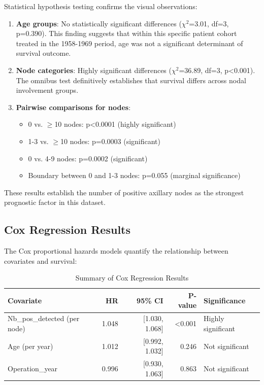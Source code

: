 \documentclass[12pt,a4paper]{article}
\begin{document}
Statistical hypothesis testing confirms the visual observations:

\begin{enumerate}
    \item \textbf{Age groups}: No statistically significant differences ($\chi^2$=3.01, df=3, p=0.390). This finding suggests that within this specific patient cohort treated in the 1958-1969 period, age was not a significant determinant of survival outcome.
    
    \item \textbf{Node categories}: Highly significant differences ($\chi^2$=36.89, df=3, p<0.001). The omnibus test definitively establishes that survival differs across nodal involvement groups.
    
    \item \textbf{Pairwise comparisons for nodes}:
    \begin{itemize}
        \item 0 vs. $\geq$10 nodes: p<0.0001 (highly significant)
        \item 1-3 vs. $\geq$10 nodes: p=0.0003 (significant)
        \item 0 vs. 4-9 nodes: p=0.0002 (significant)
        \item Boundary between 0 and 1-3 nodes: p=0.055 (marginal significance)
    \end{itemize}
\end{enumerate}

These results establish the number of positive axillary nodes as the strongest prognostic factor in this dataset.

\subsection{Cox Regression Results}

The Cox proportional hazards models quantify the relationship between covariates and survival:

\begin{table}[H]
\centering
\caption{Summary of Cox Regression Results}
\label{tab:cox_summary}
\begin{tabular}{lrrrl}
\toprule
\textbf{Covariate} & \textbf{HR} & \textbf{95\% CI} & \textbf{P-value} & \textbf{Significance} \\
\midrule
Nb\_pos\_detected (per node) & 1.048 & [1.030, 1.068] & <0.001 & Highly significant \\
Age (per year) & 1.012 & [0.992, 1.032] & 0.246 & Not significant \\
Operation\_year & 0.996 & [0.930, 1.063] & 0.863 & Not significant \\
\bottomrule
\end{tabular}
\end{table}
\end{document}
